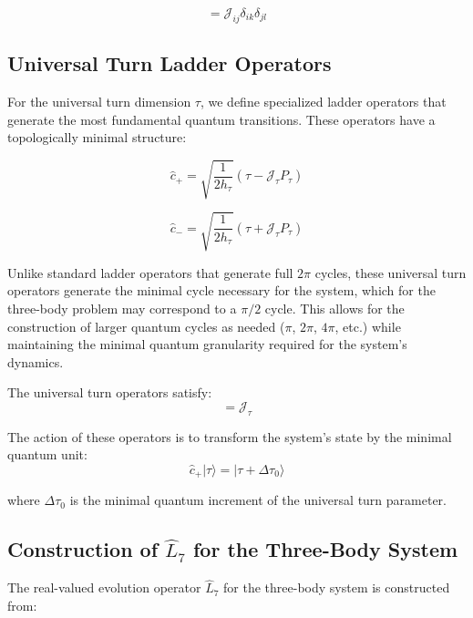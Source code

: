 \documentclass{article}
\begin{document}
\begin{equation}
[\hat{b}_{ij+}, \hat{b}_{kl-}] = \mathcal{J}_{ij} \delta_{ik}\delta_{jl}
\end{equation}

\subsection{Universal Turn Ladder Operators}

For the universal turn dimension $\tau$, we define specialized ladder operators that generate the most fundamental quantum transitions. These operators have a topologically minimal structure:

\begin{equation}
\hat{c}_+ = \sqrt{\frac{1}{2h_\tau}}(\tau - \mathcal{J}_\tau P_\tau)
\end{equation}

\begin{equation}
\hat{c}_- = \sqrt{\frac{1}{2h_\tau}}(\tau + \mathcal{J}_\tau P_\tau)
\end{equation}

Unlike standard ladder operators that generate full $2\pi$ cycles, these universal turn operators generate the minimal cycle necessary for the system, which for the three-body problem may correspond to a $\pi/2$ cycle. This allows for the construction of larger quantum cycles as needed ($\pi$, $2\pi$, $4\pi$, etc.) while maintaining the minimal quantum granularity required for the system's dynamics.

The universal turn operators satisfy:
\begin{equation}
[\hat{c}_+, \hat{c}_-] = \mathcal{J}_\tau
\end{equation}

The action of these operators is to transform the system's state by the minimal quantum unit:
\begin{equation}
\hat{c}_+ |\tau\rangle = |\tau + \Delta\tau_0\rangle
\end{equation}

where $\Delta\tau_0$ is the minimal quantum increment of the universal turn parameter.

\subsection{Construction of $\hat{L}_7$ for the Three-Body System}

The real-valued evolution operator $\hat{L}_7$ for the three-body system is constructed from:
\end{document}
